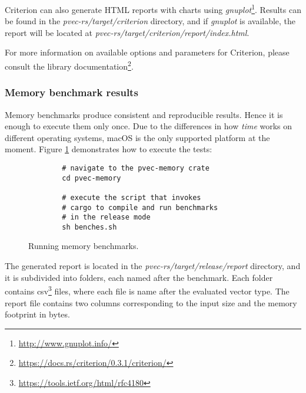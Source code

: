 Criterion can also generate HTML reports with charts using \emph{gnuplot}\footnote{\url{http://www.gnuplot.info/}}. Results can be found in the \emph{pvec-rs/target/criterion} directory, and if \emph{gnuplot} is available, the report will be located at \emph{pvec-rs/target/criterion/report/index.html}.

For more information on available options and parameters for Criterion, please consult the library documentation\footnote{\url{https://docs.rs/criterion/0.3.1/criterion/}}.

\subsubsection*{Memory benchmark results}
Memory benchmarks produce consistent and reproducible results. Hence it is enough to execute them only once. Due to the differences in how \emph{time} works on different operating systems, macOS is the only supported platform at the moment. Figure \ref{fig:memory-benches} demonstrates how to execute the tests:

\begin{figure}[!htbp]
    \centering

    \begin{verbatim}
        # navigate to the pvec-memory crate
        cd pvec-memory

        # execute the script that invokes
        # cargo to compile and run benchmarks
        # in the release mode
        sh benches.sh
    \end{verbatim}

    \caption{Running memory benchmarks.}
    \label{fig:memory-benches}
\end{figure}

The generated report is located in the \emph{pvec-rs/target/release/report} directory, and it is subdivided into folders, each named after the benchmark. Each folder contains csv\footnote{\url{https://tools.ietf.org/html/rfc4180}} files, where each file is name after the evaluated vector type. The report file contains two columns corresponding to the input size and the memory footprint in bytes.
